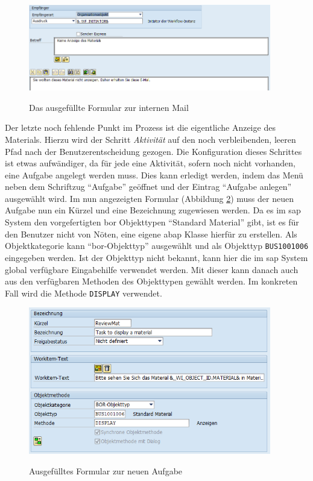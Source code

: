 \begin{figure}[h]
	\begin{center}
	\includegraphics[width=400px]{grafiken/wf-builder_bsp1_formular-mail.png}
	\caption{Das ausgefüllte Formular zur internen Mail}
	\vspace{-10pt}
	\label{abb:workflow-bsp1-mail_form}
	\end{center}
\end{figure}

Der letzte noch fehlende Punkt im Prozess ist die eigentliche Anzeige des Materials. Hierzu wird der Schritt \textit{Aktivität} auf den noch verbleibenden, leeren Pfad nach der Benutzerentscheidung gezogen. Die Konfiguration dieses Schrittes ist etwas aufwändiger, da für jede eine Aktivität, sofern noch nicht vorhanden, eine Aufgabe angelegt werden muss. Dies kann erledigt werden, indem das Menü neben dem Schriftzug "`Aufgabe"' geöffnet und der Eintrag "`Aufgabe anlegen"' ausgewählt wird. Im nun angezeigten Formular (Abbildung \ref{abb:workflow-bsp1-aufgaben_form}) muss der neuen Aufgabe nun ein Kürzel und eine Bezeichnung zugewiesen werden. Da es im \gls{sap} System den vorgefertigten \gls{bor} Objekttypen "`Standard Material"' gibt, ist es für den Benutzer nicht von Nöten, eine eigene \gls{abap} Klasse hierfür zu erstellen. Als Objektkategorie kann "`\gls{bor}-Objekttyp"' ausgewählt und als Objekttyp \texttt{BUS1001006} eingegeben werden. Ist der Objekttyp nicht bekannt, kann hier die im \gls{sap} System global verfügbare Eingabehilfe verwendet werden. Mit dieser kann danach auch aus den verfügbaren Methoden des Objekttypen gewählt werden. Im konkreten Fall wird die Methode \texttt{DISPLAY} verwendet.

\begin{figure}[h]
	\begin{center}
	\includegraphics[width=400px]{grafiken/wf-builder_bsp1_formular-aufgabe.png}
	\caption{Ausgefülltes Formular zur neuen Aufgabe}
	\vspace{-10pt}
	\label{abb:workflow-bsp1-aufgaben_form}
	\end{center}
\end{figure}

